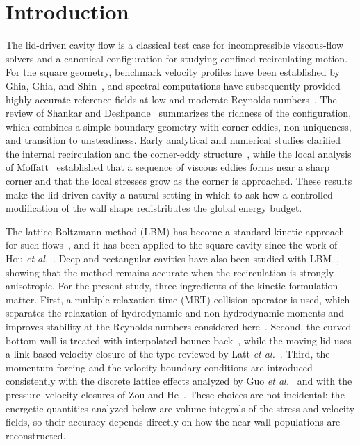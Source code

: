 \section{Introduction}
\label{sec:intro}

The lid-driven cavity flow is a classical test case for incompressible viscous-flow solvers and a canonical configuration for studying confined recirculating motion. For the square geometry, benchmark velocity profiles have been established by Ghia, Ghia, and Shin~\cite{Ghia1982}, and spectral computations have subsequently provided highly accurate reference fields at low and moderate Reynolds numbers~\cite{Botella1998,Albensoeder2005}. The review of Shankar and Deshpande~\cite{Shankar2000} summarizes the richness of the configuration, which combines a simple boundary geometry with corner eddies, non-uniqueness, and transition to unsteadiness. Early analytical and numerical studies clarified the internal recirculation and the corner-eddy structure~\cite{Batchelor1956,Burggraf1966,Pan1967}, while the local analysis of Moffatt~\cite{Moffatt1964} established that a sequence of viscous eddies forms near a sharp corner and that the local stresses grow as the corner is approached. These results make the lid-driven cavity a natural setting in which to ask how a controlled modification of the wall shape redistributes the global energy budget.

The lattice Boltzmann method (LBM) has become a standard kinetic approach for such flows~\cite{Benzi1992,Chen1998,Succi2001}, and it has been applied to the square cavity since the work of Hou \emph{et al.}~\cite{Hou1995}. Deep and rectangular cavities have also been studied with LBM~\cite{Patil2006}, showing that the method remains accurate when the recirculation is strongly anisotropic. For the present study, three ingredients of the kinetic formulation matter. First, a multiple-relaxation-time (MRT) collision operator is used, which separates the relaxation of hydrodynamic and non-hydrodynamic moments and improves stability at the Reynolds numbers considered here~\cite{dHumieres2002,Lallemand2000}. Second, the curved bottom wall is treated with interpolated bounce-back~\cite{Bouzidi2001}, while the moving lid uses a link-based velocity closure of the type reviewed by Latt \emph{et al.}~\cite{Latt2008}. Third, the momentum forcing and the velocity boundary conditions are introduced consistently with the discrete lattice effects analyzed by Guo \emph{et al.}~\cite{Guo2002} and with the pressure--velocity closures of Zou and He~\cite{Zou1997}. These choices are not incidental: the energetic quantities analyzed below are volume integrals of the stress and velocity fields, so their accuracy depends directly on how the near-wall populations are reconstructed.

